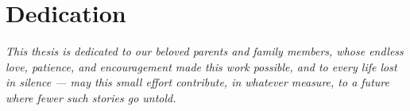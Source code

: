 \chapter*{Dedication}

\begin{center}
\large\itshape
This thesis is dedicated to our beloved parents and family members,
whose endless love, patience, and encouragement made this work possible,
and to every life lost in silence --- may this small effort contribute,
in whatever measure, to a future where fewer such stories go untold.
\end{center}

\clearpage
